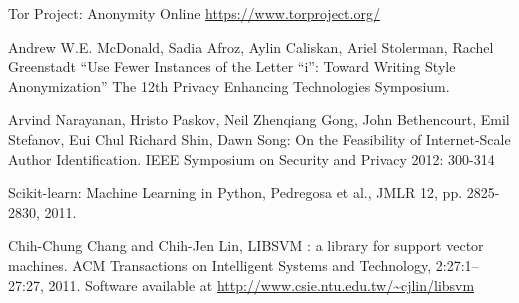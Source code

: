 \documentclass[12pt,letterpaper,onecolumn,oneside]{article}
\numberwithin{equation}{section}
\numberwithin{figure}{section}
\begin{document}
\begin{thebibliography}{1}
\begin{singlespace}

Tor Project: Anonymity Online \url{https://www.torproject.org/}

Andrew W.E. McDonald, Sadia Afroz, Aylin Caliskan, Ariel Stolerman, Rachel Greenstadt ``Use Fewer Instances of the Letter ``i'': Toward Writing Style Anonymization'' The 12th Privacy Enhancing Technologies Symposium.

Arvind Narayanan, Hristo Paskov, Neil Zhenqiang Gong, John Bethencourt, Emil Stefanov, Eui Chul Richard Shin, Dawn Song: On the Feasibility of Internet-Scale Author Identification. IEEE Symposium on Security and Privacy 2012: 300-314

Scikit-learn: Machine Learning in Python, Pedregosa et al., JMLR 12, pp. 2825-2830, 2011.

Chih-Chung Chang and Chih-Jen Lin, LIBSVM : a library for support vector machines. ACM Transactions on Intelligent Systems and Technology, 2:27:1--27:27, 2011. Software available at \url{http://www.csie.ntu.edu.tw/~cjlin/libsvm}

\end{singlespace}
\end{thebibliography}
\end{document}

